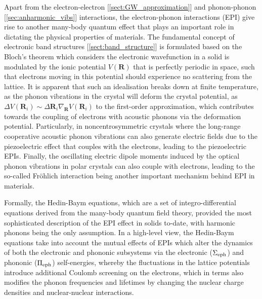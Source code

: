 Apart from the electron-electron [\cref{sect:GW_approximation}] and phonon-phonon [\cref{sec:anharmonic_vibs}] interactions, the electron-phonon interactions (EPI) give rise to another many-body quantum effect that plays an important role in dictating the physical properties of materials. The fundamental concept of electronic band structures [\cref{sect:band_structure}] is formulated based on the Bloch's theorem which considers the electronic wavefunction in a solid is modulated by the ionic potential $V(\bm{R})$ that is perfectly periodic in space, such that electrons moving in this potential should experience no scattering from the lattice. It is apparent that such an idealisation breaks down at finite temperature, as the phonon vibrations in the crystal will deform the crystal potential, as $\Delta V(\bm{R}_i)\sim \Delta \bm{R}_i\nabla_{\bm{R}}V(\bm{R}_{i})$ to the first-order approximation, which contributes towards the coupling of electrons with acoustic phonons via the deformation potential.\cite{khan1984deformation} Particularly, in noncentrosymmetric crystals where the long-range cooperative acoustic phonon vibrations can also generate electric fields due to the piezoelectric effect that couples with the electrons, leading to the piezoelectric EPIs.\cite{zook1964piezoelectric}   Finally, the oscillating electric dipole moments induced by the optical phonon vibrations in polar crystals can also couple with electrons, leading to the so-called Fr\"{o}hlich interaction\cite{frohlich1954electrons} being another important mechanism behind EPI in materials. 

Formally, the Hedin-Baym equations,\cite{hedin1965new,baym1961field} which are a set of integro-differential equations derived from the many-body quantum field theory, provided the most sophisticated description of the EPI effect in solids to-date, with harmonic phonons being the only assumption.\cite{giustino2017electron} In a high-level view, the Hedin-Baym equations take into account the  mutual effects of EPIs which alter the dynamics of both the electronic and phononic subsystems via the electronic ($\Sigma_{\mbox{\scriptsize{eph}}}$) and phononic ($\Pi_{\mbox{\scriptsize{eph}}}$) self-energies, whereby the fluctuations in the lattice potentials introduce additional Coulomb screening on the electrons, which in terms also modifies the phonon  frequencies and lifetimes by changing the nuclear charge densities and nuclear-nuclear interactions. 

